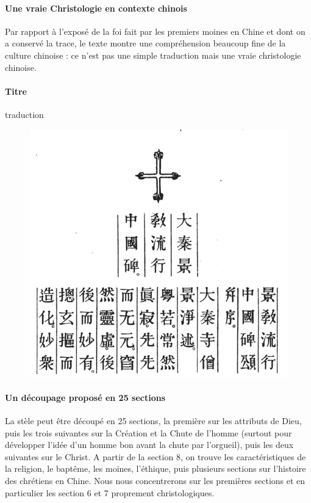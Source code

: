 \paragraph{Une vraie Christologie en contexte chinois} Par rapport à l'exposé de la foi fait par les premiers moines en Chine et dont on a conservé la trace, le texte montre une compréhension beaucoup fine de la culture chinoise : ce n'est pas une simple traduction mais une vraie christologie chinoise.

\paragraph{Titre}
traduction  \cite{Havret:stelechretienne}
\begin{figure}[h!]
    \centering
    \includegraphics[width=\textwidth]{ChristologieCultureHistoire/Images/PremierParagrapheStele.png}
 
    \label{fig:my_label}
\end{figure}
\paragraph{Un découpage proposé en 25 sections} La stèle peut être découpé en 25 sections, la première sur les attributs de Dieu, puis les trois suivantes sur la Création et la Chute de l'homme (surtout pour développer l'idée d'un homme bon avant la chute par l'orgueil), puis les deux suivantes sur le Christ. A partir de la section 8, on trouve les caractéristiques de la religion, le baptême, les moines, l'éthique, puis plusieurs sections sur l'histoire des chrétiens en Chine. Nous nous concentrerons sur les premières sections et en particulier les section 6 et 7 proprement christologiques.  

